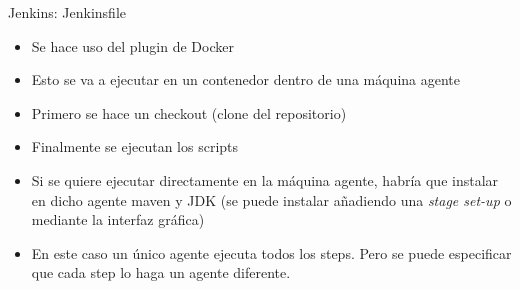 \documentclass{beamer}
\begin{document}
\begin{frame}{Jenkins: Jenkinsfile}

\begin{itemize}
    \item Se hace uso del plugin de Docker
    \item Esto se va a ejecutar en un contenedor dentro de una máquina agente
    \item Primero se hace un checkout (clone del repositorio)
    \item Finalmente se ejecutan los scripts
    \item Si se quiere ejecutar directamente en la máquina agente, habría que instalar en dicho agente maven y JDK (se puede instalar añadiendo una \textit{stage set-up} o mediante la interfaz gráfica)
    \item En este caso un único agente ejecuta todos los steps. Pero se puede especificar que cada step lo haga un agente diferente.
\end{itemize}
    
\end{frame}
\end{document}
